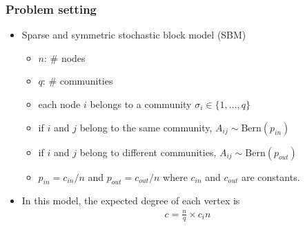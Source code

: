 \documentclass[dvipdfmx,11pt]{beamer}
\begin{document}
\begin{frame}
  \frametitle{Problem setting}
  \begin{itemize}
    \item Sparse and symmetric stochastic block model (SBM)
    \begin{itemize}
      \item $n$:  $\#$ nodes
      \item $q$:  $\#$ communities
      \item each node $i$ belongs to a community $\sigma_i \in \{1, \dots, q\}$
      \item if $i$ and $j$ belong to the same community, $A_{ij} \sim \text{Bern}(p_{in})$
      \item if $i$ and $j$ belong to different communities, $A_{ij} \sim \text{Bern}(p_{out})$
      \item $p_{in} = c_{in} / n$ and $p_{out} = c_{out} / n$ where $c_{in}$ and $c_{out}$ are constants.
    \end{itemize}
    \item In this model, the expected degree of each vertex is 
    \begin{align}
      c = \frac{n}{q} \times {c_in} 
    \end{align}
  \end{itemize}

  

\end{frame}
\end{document}
